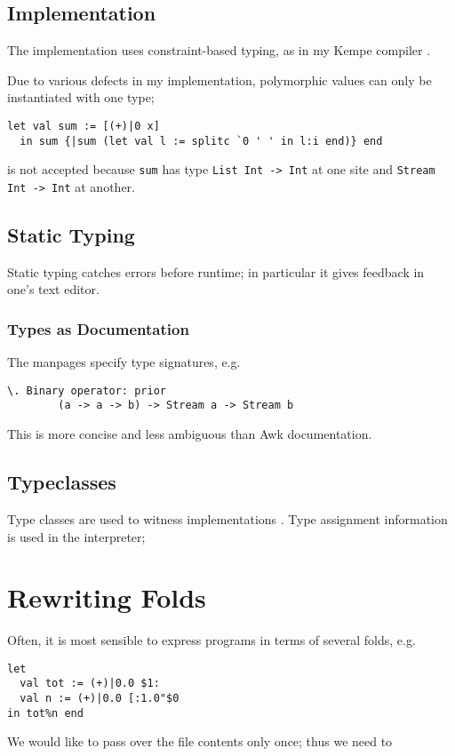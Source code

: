 \documentclass{report}
\begin{document}
\subsection{Implementation}

The implementation uses constraint-based typing, as in my Kempe compiler \cite{kempe}. 

Due to various defects in my implementation, polymorphic values can only be instantiated with one type;

\begin{verbatim}
let val sum := [(+)|0 x]
  in sum {|sum (let val l := splitc `0 ' ' in l:i end)} end
\end{verbatim}

is not accepted because {\tt sum} has type {\tt List Int -> Int} at one site and {\tt Stream Int -> Int} at another.

\subsection{Static Typing}

Static typing catches errors before runtime; in particular it gives feedback in one's text editor.

\subsubsection{Types as Documentation}

The manpages specify type signatures, e.g.

\begin{verbatim}
\. Binary operator: prior
        (a -> a -> b) -> Stream a -> Stream b
\end{verbatim}

This is more concise and less ambiguous than Awk documentation.

\subsection{Typeclasses}

Type classes are used to witness implementations \cite{adhoc}. Type assignment information is used in the interpreter;

\section{Rewriting Folds}

Often, it is most sensible to express programs in terms of several folds, e.g.

\begin{verbatim}
let
  val tot := (+)|0.0 $1:
  val n := (+)|0.0 [:1.0"$0
in tot%n end
\end{verbatim}

We would like to pass over the file contents only once; thus we need to



\end{document}

